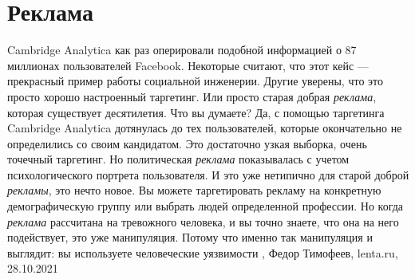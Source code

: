  
 
 
 
 
\chapter{Реклама}
\label{sec:slova.reklama}

Cambridge Analytica как раз оперировали подобной информацией о 87 миллионах
пользователей Facebook. Некоторые считают, что этот кейс — прекрасный пример
работы социальной инженерии. Другие уверены, что это просто хорошо настроенный
таргетинг. Или просто старая добрая \emph{реклама}, которая существует десятилетия.
Что вы думаете?  Да, с помощью таргетинга Cambridge Analytica дотянулась до тех
пользователей, которые окончательно не определились со своим кандидатом. Это
достаточно узкая выборка, очень точечный таргетинг.  Но политическая \emph{реклама}
показывалась с учетом психологического портрета пользователя. И это уже
нетипично для старой доброй \emph{рекламы}, это нечто новое.  Вы можете таргетировать
рекламу на конкретную демографическую группу или выбрать людей определенной
профессии. Но когда \emph{реклама} рассчитана на тревожного человека, и вы точно
знаете, что она на него подействует, это уже манипуляция.  Потому что именно
так манипуляция и выглядит: вы используете человеческие уязвимости
, 
Федор Тимофеев, lenta.ru, 28.10.2021
